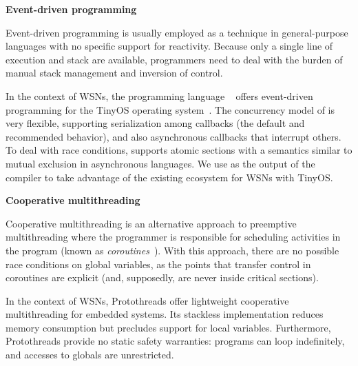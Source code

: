 \textbf{Event-driven programming}

Event-driven programming is usually employed as a technique in general-purpose 
languages with no specific support for reactivity.
Because only a single line of execution and stack are available, programmers 
need to deal with the burden of manual stack management and inversion of 
control.~\cite{sync_async.cooperative}

In the context of WSNs, the programming language \nesc~\cite{wsn.nesc} offers 
event-driven programming for the TinyOS operating system~\cite{wsn.tos}.
The concurrency model of \nesc is very flexible, supporting serialization among 
callbacks (the default and recommended behavior), and also asynchronous 
callbacks that interrupt others.
To deal with race conditions, \nesc supports atomic sections with a semantics 
similar to mutual exclusion in asynchronous languages.
We use \nesc as the output of the \CEU compiler to take advantage of the 
existing ecosystem for WSNs with TinyOS.

\textbf{Cooperative multithreading}

Cooperative multithreading is an alternative approach to preemptive 
multithreading where the programmer is responsible for scheduling activities in 
the program (known as \emph{coroutines}~\cite{lua.coroutines}).
With this approach, there are no possible race conditions on global variables, 
as the points that transfer control in coroutines are explicit (and, 
supposedly, are never inside critical sections).

In the context of WSNs, Protothreads \cite{wsn.protothreads} offer lightweight 
cooperative multithreading for embedded systems.
Its stackless implementation reduces memory consumption but precludes support 
for local variables.
Furthermore, Protothreads provide no static safety warranties: programs can 
loop indefinitely, and accesses to globals are unrestricted.

